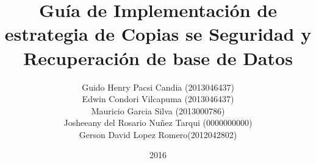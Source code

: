 \documentclass[a4paper,20pt]{report}
\title{Guía de Implementación de estrategia de Copias se Seguridad y Recuperación de base de Datos}
\author{Guido Henry Pacsi Candia (2013046437)\\Edwin Condori Vilcapuma (2013046437)\\Mauricio Garcia Silva (2013000786)\\Josheeany del Rosario Nuñez Tarqui (0000000000)\\Gerson David Lopez  Romero(2012042802)}
\date{2016}
\begin{document}
\maketitle 

\doublespacing

\tableofcontents %

\listoftables %
\listoffigures %







\renewcommand{\bibname}{BIBLIOGRAFIA}



\renewcommand\appendixname{Anexo}
\appendix

\end{document}
